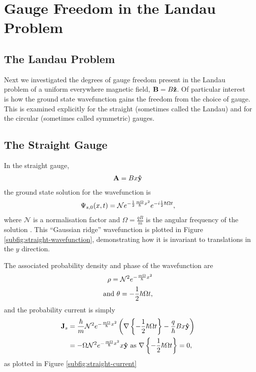\section{Gauge Freedom in the Landau Problem}
\label{sec:landau}

\subsection{The Landau Problem}

Next we investigated the degrees of gauge freedom present in the Landau problem
of a uniform everywhere magnetic field, $\mathbf{B} = B \mathbf{\hat z }$. Of
particular interest is how the ground state wavefunction gains the freedom from
the choice of gauge. This is examined explicitly for the straight (sometimes
called the Landau) and for the circular (sometimes called symmetric) gauges.

\subsection{The Straight Gauge}

In the straight gauge,
\begin{align}
    \mathbf{A} = Bx\mathbf{\hat y }
    \label{eqn:straight-gauge}
\end{align}
the ground state solution for the wavefunction is
\begin{align}
    \Psi_{s,0}(x,t) = \mathcal{N} e^{- \frac{1}{2} \frac{m \Omega}{\hbar} x^2} e^{-i \frac{1}{2}
        \hbar \Omega t},
\end{align}
where $\mathcal{N}$ is a normalisation factor and $\Omega = \frac{qB}{m}$ is the
angular frequency of the solution \cite{murayama}. This ``Gaussian ridge''
wavefunction is plotted in Figure \ref{subfig:straight-wavefunction}, demonstrating
how it is invariant to translations in the $y$ direction.

The associated probability density and phase
of the wavefunction are
\begin{align}
    \rho = \mathcal{N}^2 e^{- \frac{m \Omega}{\hbar} x^2} \\
    \mathrm{and}~ \theta = - \frac{1}{2} \hbar \Omega t,
\end{align}
and the probability current is simply
\begin{align}
    \mathbf{J}_s &= \frac{\hbar}{m} \mathcal{N}^2 e^{- \frac{m \Omega}{\hbar} x^2} \left(
        \nabla \left\{ -\frac{1}{2} \hbar \Omega t \right\} - \frac{q}{\hbar} B
        x \mathbf{\hat y } \right) \\
    &= - \Omega \mathcal{N}^2 e^{- \frac{m \Omega}{\hbar} x^2} x\mathbf{\hat y } ~\mathrm{as}~
        \nabla \left\{ -\frac{1}{2} \hbar \Omega t \right\} = 0,
\end{align}
as plotted in Figure \ref{subfig:straight-current}


